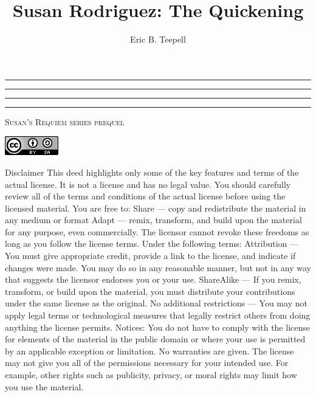 \documentclass[12pt,twoside,onecolumn,openright,extrafontsizes]{memoir}
\title{Susan Rodriguez: The Quickening}
\author{Eric B. Teepell}
\newcommand{\press}{Susan's Requiem series prequel}
\newcommand*\halftitlepage{\begingroup %
  \setlength\drop{0.1\textheight}
  \begin{center}
  \vspace*{\drop}
  \rule{\textwidth}{0in}\par
  {\Large\textsc\thetitle\par}
  \rule{\textwidth}{0in}\par
  \vfill
  \end{center}
\endgroup}
\newlength\drop
\newcommand*\titleM{\begingroup %
  \setlength\drop{0.15\textheight}
  \begin{center}
  \vspace*{\drop}
  \rule{\textwidth}{0in}\par
  {\HUGE\textsc\thetitle\par}
  \rule{\textwidth}{0in}\par
  {\Large\textit\theauthor\par}
  \vfill
  {\Large\scshape\press}
  \end{center}
\endgroup}
\begin{document}
\pagestyle{empty}
\halftitlepage
\cleardoublepage
\titleM
\clearpage

\begin{center}
 	\centering
	\includegraphics[width=0.25\linewidth=0.25]{license.png}
\end{center}

\newpage
{\tiny Disclaimer This deed highlights only some of the key features and terms of the actual license. It is not a license and has no legal value. You should carefully review all of the terms and conditions of the actual license before using the licensed material. You are free to: Share — copy and redistribute the material in any medium or format Adapt — remix, transform, and build upon the material
for any purpose, even commercially. The licensor cannot revoke these freedoms as long as you follow the license terms. Under the following terms: Attribution — You must give appropriate credit, provide a link to the license, and indicate if changes were made. You may do so in any reasonable manner, but not in any way that suggests the licensor endorses you or your use. ShareAlike — If you remix, transform, or build upon the material, you must distribute your contributions under the same license as the original. No additional restrictions — You may not apply legal terms or technological measures that legally restrict others from doing anything the license permits. Notices: You do not have to comply with the license for elements of the material in the public domain or where your use is permitted by an applicable exception or limitation. No warranties are given. The license may not give you all of the permissions necessary for your intended use. For example, other rights such as publicity, privacy, or moral rights may limit how you use the material.
}
\clearpage
\end{document}
